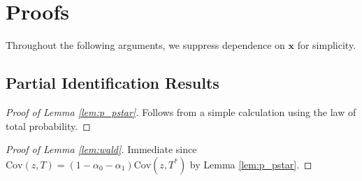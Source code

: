 \section{Proofs}
\label{sec:proofs}
Throughout the following arguments, we suppress dependence on $\mathbf{x}$ for simplicity.

\subsection{Partial Identification Results}
\begin{proof}[Proof of Lemma \ref{lem:p_pstar}]
  Follows from a simple calculation using the law of total probability.
\end{proof}

\begin{proof}[Proof of Lemma \ref{lem:wald}]
  Immediate since $\mbox{Cov}(z,T) = (1 - \alpha_0 - \alpha_1) \mbox{Cov}(z,T^*)$ by Lemma \ref{lem:p_pstar}.
\end{proof}

